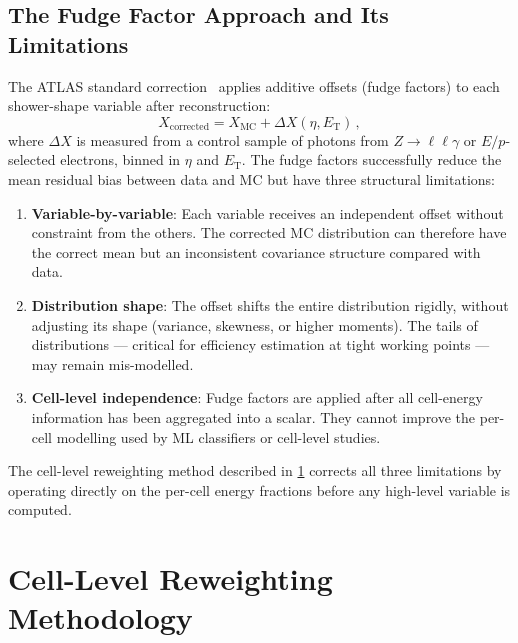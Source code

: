 \documentclass[11pt,a4paper]{article}
\begin{document}
\subsection{The Fudge Factor Approach and Its Limitations}
\label{sec:discrepancy:fudge}

The ATLAS standard correction~\cite{ATLAS:fudgePub} applies
additive offsets (fudge factors) to each shower-shape variable
after reconstruction:
\begin{equation}
  X_\mathrm{corrected} = X_\mathrm{MC} + \Delta X(\eta, E_\mathrm{T})\,,
  \label{eq:fudge}
\end{equation}
where $\Delta X$ is measured from a control sample of photons from
$Z \to \ell\ell\gamma$ or $E/p$-selected electrons, binned in
$\eta$ and $E_\mathrm{T}$.  The fudge factors successfully reduce
the mean residual bias between data and MC but have three structural
limitations:
\begin{enumerate}[label=(\roman*)]
  \item \textbf{Variable-by-variable}: Each variable receives an
        independent offset without constraint from the others.  The
        corrected MC distribution can therefore have the correct
        mean but an inconsistent covariance structure compared with
        data.
  \item \textbf{Distribution shape}: The offset shifts the entire
        distribution rigidly, without adjusting its shape
        (variance, skewness, or higher moments).  The tails of
        distributions — critical for efficiency estimation at tight
        working points — may remain mis-modelled.
  \item \textbf{Cell-level independence}: Fudge factors are applied
        after all cell-energy information has been aggregated into a
        scalar.  They cannot improve the per-cell modelling used by
        ML classifiers or cell-level studies.
\end{enumerate}

The cell-level reweighting method described in \cref{sec:method}
corrects all three limitations by operating directly on the
per-cell energy fractions before any high-level variable is
computed.


\section{Cell-Level Reweighting Methodology}
\label{sec:method}
\end{document}
